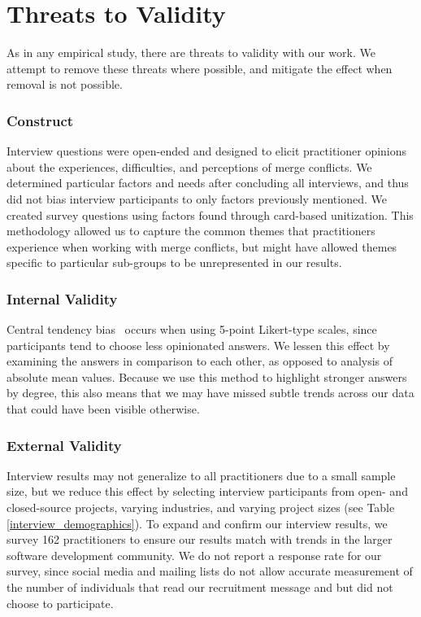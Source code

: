 \section{Threats to Validity}\label{threats}
As in any empirical study, there are threats to validity with our work.
We attempt to remove these threats where possible, and mitigate the effect when removal is not possible.
\subsubsection{Construct}
Interview questions were open-ended and designed to elicit practitioner opinions about the experiences, difficulties, and perceptions of merge conflicts.
We determined particular factors and needs after concluding all interviews, and thus did not bias interview participants to only factors previously mentioned.
We created survey questions using factors found through card-based unitization.
This methodology allowed us to capture the common themes that practitioners experience when working with merge conflicts, but might have allowed themes specific to particular sub-groups to be unrepresented in our results.

\subsubsection{Internal Validity}
Central tendency bias~\cite{guilford1954psychometric} occurs when using 5-point Likert-type scales, since participants tend to choose less opinionated answers.
We lessen this effect by examining the answers in comparison to each other, as opposed to analysis of absolute mean values.
Because we use this method to highlight stronger answers by degree, this also means that we may have missed subtle trends across our data that could have been visible otherwise.

\subsubsection{External Validity}
Interview results may not generalize to all practitioners due to a small sample size, but we reduce this effect by selecting interview participants from open- and closed-source projects, varying industries, and varying project sizes (see Table \ref{interview_demographics}).
To expand and confirm our interview results, we survey 162 practitioners to ensure our results match with trends in the larger software development community.
We do not report a response rate for our survey, since social media and mailing lists do not allow accurate measurement of the number of individuals that read our recruitment message and but did not choose to participate.




